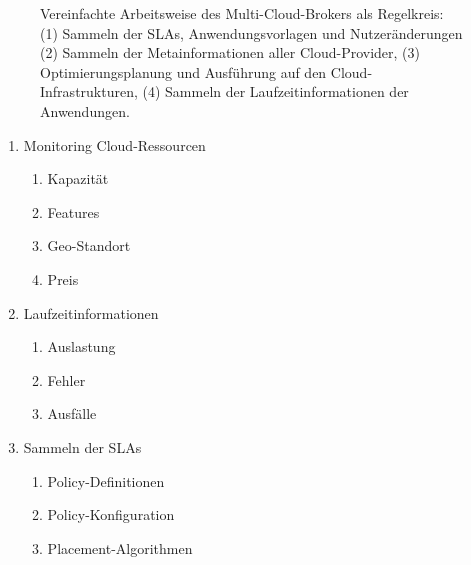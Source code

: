 \begin{figure}
	\centering	
	\def\svgwidth{0.95\textwidth}
	{\tiny \textsf{
	}}
	\caption{Vereinfachte Arbeitsweise des Multi-Cloud-Brokers als Regelkreis: (1) Sammeln der SLAs, Anwendungsvorlagen und Nutzeränderungen (2) Sammeln der Metainformationen aller Cloud-Provider, (3) Optimierungsplanung und Ausführung auf den Cloud-Infrastrukturen, (4) Sammeln der Laufzeitinformationen der Anwendungen.}
	\label{fig:cycle}
\end{figure}

\begin{minipage}[b]{0.45\linewidth}
\begin{flushleft}
\begin{enumerate}
\item Monitoring Cloud-Ressourcen
\begin{enumerate}
	\item Kapazität%
	\item Features%
	\item Geo-Standort
	\item Preis
\end{enumerate}
\item Laufzeitinformationen%
\begin{enumerate}
	\item Auslastung
	\item Fehler
	\item Ausfälle
\end{enumerate}
\item Sammeln der SLAs
\begin{enumerate}
	\item Policy-Definitionen
	\item Policy-Konfiguration
	\item Placement-Algorithmen
\end{enumerate}
\end{enumerate}
\end{flushleft}
\end{minipage}
%
\hspace{0.5cm}
%
